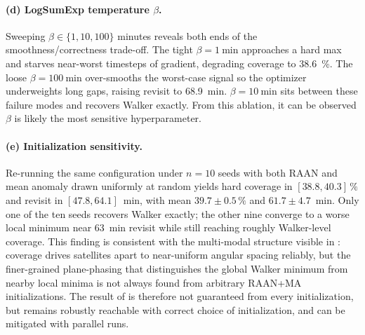\paragraph{(d) LogSumExp temperature $\beta$.}
Sweeping $\beta \in \{1, 10, 100\}$ minutes reveals both ends of the smoothness/correctness trade-off.
The tight $\beta = \SI{1}{\minute}$ approaches a hard max and starves near-worst timesteps of gradient, degrading coverage to \SI{38.6}{\percent}.
The loose $\beta = \SI{100}{\minute}$ over-smooths the worst-case signal so the optimizer underweights long gaps, raising revisit to \SI{68.9}{\minute}.
$\beta = \SI{10}{\minute}$ sits between these failure modes and recovers Walker exactly. From this ablation, it can be observed $\beta$ is likely the most sensitive hyperparameter.

\paragraph{(e) Initialization sensitivity.}
Re-running the same configuration under $n = 10$ seeds with both RAAN and mean anomaly drawn uniformly at random yields hard coverage in $[38.8, 40.3]\,\%$ and revisit in $[47.8, 64.1]$~min, with mean $39.7 \pm 0.5\,\%$ and $61.7 \pm 4.7$~min.
Only one of the ten seeds recovers Walker exactly; the other nine converge to a worse local minimum near \SI{63}{\minute} revisit while still reaching roughly Walker-level coverage.
This finding is consistent with the multi-modal structure visible in : coverage drives satellites apart to near-uniform angular spacing reliably, but the finer-grained plane-phasing that distinguishes the global Walker minimum from nearby local minima is not always found from arbitrary RAAN+MA initializations.
The result of  is therefore not guaranteed from every initialization, but remains robustly reachable with correct choice of initialization, and can be mitigated with parallel runs.

